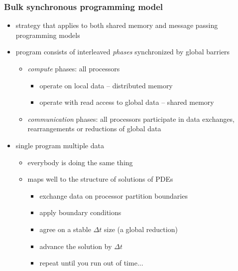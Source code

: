 \begin{frame}[fragile]
%
  \frametitle{Bulk synchronous programming model}
%
  \begin{itemize}
%
  \item strategy that applies to both shared memory and message passing programming models
%
  \item program consists of interleaved {\em phases} synchronized by global barriers
    \begin{itemize}
      \item {\em compute} phases: all processors 
        \begin{itemize}
          \item operate on local data -- distributed memory
          \item operate with read access to global data -- shared memory
        \end{itemize}
      \item {\em communication} phases: all processors participate in data exchanges,
        rearrangements or reductions of global data
    \end{itemize}
%
    \item single program multiple data
      \begin{itemize}
        \item everybody is doing the same thing
        \item maps well to the structure of solutions of PDEs
          \begin{itemize}
            \item exchange data on processor partition boundaries 
            \item apply boundary conditions
            \item agree on a stable $\Delta t$ size (a global reduction)
            \item advance the solution by $\Delta t$
            \item repeat until you run out of time...
          \end{itemize}
      \end{itemize}
%
  \end{itemize}
%
\end{frame}

